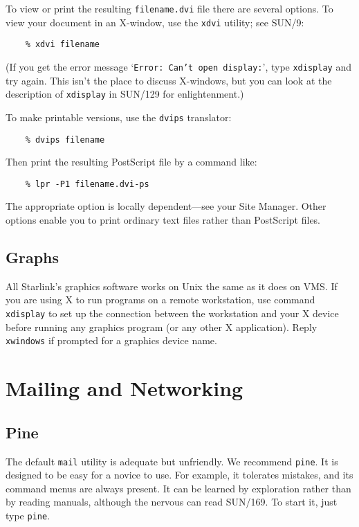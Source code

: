 To view or print the resulting {\tt filename.dvi} file there are several
options. 
To view your document in an X-window, use the {\tt xdvi} utility; see SUN/9:
\begin{verbatim}
    % xdvi filename
\end{verbatim}
(If you get the error message `{\tt Error: Can't open display:}', type
{\tt xdisplay} and try again.
This isn't the place to discuss X-windows, but you can look at the description
of {\tt xdisplay} in SUN/129 for enlightenment.)

To make printable versions, use the {\tt dvips} translator:
\begin{verbatim}
    % dvips filename
\end{verbatim}
Then print the resulting PostScript file by a command like:
\begin{verbatim}
    % lpr -P1 filename.dvi-ps
\end{verbatim}
The appropriate option is locally dependent---see your Site Manager.
Other options enable you to print ordinary text files rather than PostScript
files.

\subsection{Graphs}

All Starlink's graphics software works on Unix the same as it does on VMS.
If you are using X to run programs on a remote workstation, use command
{\tt xdisplay} to set up the connection between the workstation and your X
device before running any graphics program (or any other X application).
Reply {\tt xwindows} if prompted for a graphics device name.

\section{Mailing and Networking}
\label{Mail}

\subsection{Pine}

The default {\tt mail} utility is adequate but unfriendly.
We recommend {\tt pine}.
It is designed to be easy for a novice to use.
For example, it tolerates mistakes, and its command menus are always present.
It can be learned by exploration rather than by reading manuals, although the
nervous can read SUN/169.
To start it, just type {\tt pine}.

